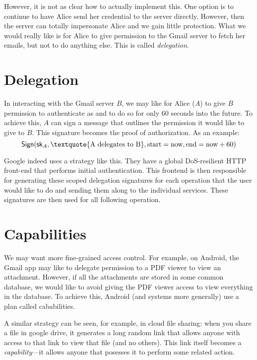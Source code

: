 However, it is not as clear how to actually implement this. One option is to continue to have Alice send her credential to the server directly. However, then the server can totally impersonate Alice and we gain little protection. What we would really like is for Alice to give permission to the Gmail server to fetch her emails, but not to do anything else. This is called \emph{delegation}.

\section{Delegation}
In interacting with the Gmail server $B$, we may like for Alice ($A$) to give $B$ permission to authenticate as  and to do so for only 60 seconds into the future. To achieve this, $A$ can sign a message that outlines the permission it would like to give to $B$. This signature becomes the proof of authorization. As an example:
\[ \Sign(\sk_A, \text{\textquote{A delegates to B}}, \text{start}=\text{now}, \text{end}=\text{now}+60) \]

Google indeed uses a strategy like this. They have a global DoS-resilient HTTP front-end that performs initial authentication. This frontend is then responsible for generating these scoped delegation signatures for each operation that the user would like to do and sending them along to the individual services. These signatures are then used for all following operation.

\section{Capabilities}
We may want more fine-grained access control. For example, on Android, the Gmail app may like to delegate permission to a PDF viewer to view an attachment. However, if all the attachments are stored in some common database, we would like to avoid giving the PDF viewer access to view everything in the database. To achieve this, Android (and systems more generally) use a plan called cababilities.

A similar strategy can be seen, for example, in cloud file sharing: when you share a file in google drive, it generates a long random link that allows anyone with access to that link to view that file (and no others). This link itself becomes a \emph{capability}---it allows anyone that posesses it to perform some related action.
